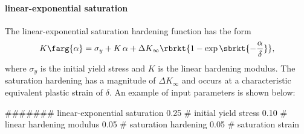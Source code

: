 \paragraph{linear-exponential saturation}
The linear-exponential saturation hardening function has the form
\begin{equation}
K\farg{\alpha} = \sigma_{y} + K\,\alpha 
+ \Delta K_{\infty} \rbrkt{1 - \exp \sbrkt{-\frac{\alpha}{\delta}}},
\end{equation}
where $\sigma_{y}$ is the initial yield stress and $K$ is the 
linear hardening modulus. The saturation hardening has a magnitude of
$\Delta K_{\infty}$ and occurs at a characteristic 
equivalent plastic strain of $\delta$. An example of input parameters is shown below:
\begin{inputfile}
####### linear-exponential saturation
0.25  # initial yield stress
0.10  # linear hardening modulus
0.05  # saturation hardening
0.05  # saturation strain
\end{inputfile}	

